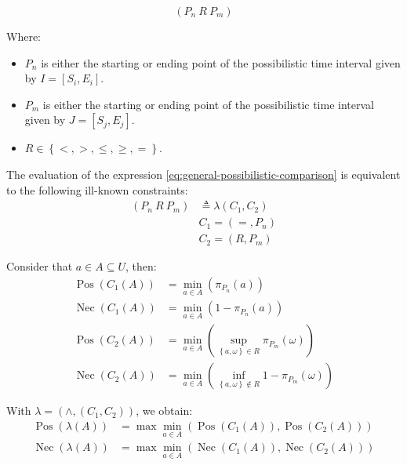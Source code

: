 \documentclass{llncs}
\newcommand{\Pos}{\operatorname{Pos}}
\newcommand{\Nec}{\operatorname{Nec}}
\begin{document}
\begin{equation}
\label{eq:general-possibilistic-comparison}
\left(P_n\  R \  P_m \right) 
\end{equation}

Where:
\begin{itemize}
 \item  $P_n$ is either the starting or ending point of the possibilistic time interval given by $I = \left[S_i, E_i \right]$.
\item $P_m$ is either the starting or ending point of the possibilistic time interval given by $J = \left[S_j, E_j \right]$.
\item $R \in \left \lbrace <, >, \leq, \geq, = \right \rbrace$.
\end{itemize}

The evaluation of the expression \eqref{eq:general-possibilistic-comparison} is equivalent to the following ill-known constraints:
\begin{align}
 \label{eq:evaluation-by-ill-known}
\left(P_n\  R \  P_m \right)  &\triangleq \lambda \left( C_1 , C_2 \right) \\
\nonumber
& C_1 =\left(=, P_n \right) \\
\nonumber
& C_2 = \left(R, P_m \right)
\end{align}

Consider that $a \in A \subseteq U$, then:
\begin{align}
 \label{eq:evaluation-1}
\Pos \left(C_1 \left(A \right)\right) &= \min_{a  \in A} \left(\pi_{P_n} \left(a \right) \right)\\
\nonumber
\Nec \left(C_1 \left(A \right) \right) &= \min_{a  \in A} \left(1-\pi_{P_n} \left(a \right)\right)\\
\nonumber
\Pos \left(C_2 \left(A \right)\right) &= \min_{a \in A} \left(\sup_{\left \lbrace a , \omega \right \rbrace \in R}  \pi_{P_m} \left(\omega \right) \right)\\
\nonumber
\Nec \left(C_2 \left(A \right) \right) &= \min_{a \in A} \left(\inf_{\left \lbrace a, \omega \right \rbrace  \not \in R} 1-\pi_{P_m}\left(\omega \right) \right)
\end{align}

With $\lambda = \left(\wedge, \left(C_1, C_2 \right) \right)$, we obtain:
\begin{align}
 \label{eq:eval-2}
\Pos \left(\lambda \left(A \right)\right) &= \max \min_{a \in A} \left(\Pos \left(C_1 \left( A\right) \right), \Pos \left(C_2\left(A \right) \right) \right)\\
\nonumber
\Nec \left(\lambda \left(A\right)\right) &= \max \min_{a \in A} \left(\Nec \left(C_1 \left( A\right) \right), \Nec \left(C_2\left(A \right) \right) \right)
\end{align}
\end{document}
